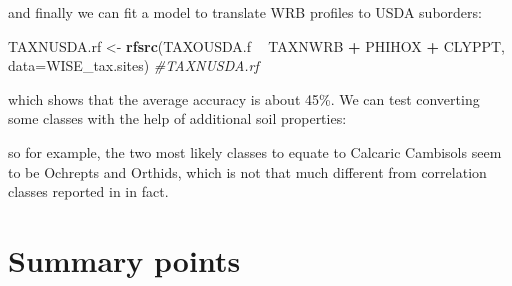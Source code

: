\documentclass[graybox,natbib,nospthms,UStrade]{svmono}
\newenvironment{Shaded}{\begin{snugshade}}{\end{snugshade}}
\newcommand{\CommentTok}[1]{\textcolor[rgb]{0.37,0.37,0.37}{\textit{#1}}}
\newcommand{\DataTypeTok}[1]{\textcolor[rgb]{0.27,0.27,0.27}{#1}}
\newcommand{\DecValTok}[1]{\textcolor[rgb]{0.06,0.06,0.06}{#1}}
\newcommand{\FloatTok}[1]{\textcolor[rgb]{0.06,0.06,0.06}{#1}}
\newcommand{\KeywordTok}[1]{\textcolor[rgb]{0.27,0.27,0.27}{\textbf{#1}}}
\newcommand{\NormalTok}[1]{#1}
\newcommand{\OperatorTok}[1]{\textcolor[rgb]{0.43,0.43,0.43}{\textbf{#1}}}
\newcommand{\StringTok}[1]{\textcolor[rgb]{0.5,0.5,0.5}{#1}}
\begin{document}
and finally we can fit a model to translate WRB profiles to USDA suborders:

\begin{Shaded}
\begin{Highlighting}[]
\NormalTok{TAXNUSDA.rf <-}\StringTok{ }\KeywordTok{rfsrc}\NormalTok{(TAXOUSDA.f }\OperatorTok{~}\StringTok{ }\NormalTok{TAXNWRB }\OperatorTok{+}\StringTok{ }\NormalTok{PHIHOX }\OperatorTok{+}\StringTok{ }\NormalTok{CLYPPT, }\DataTypeTok{data=}\NormalTok{WISE_tax.sites)}
\CommentTok{#TAXNUSDA.rf}
\end{Highlighting}
\end{Shaded}

which shows that the average accuracy is about 45\%. We can test converting some classes with the help of additional soil properties:

\begin{Shaded}
\end{Shaded}

so for example, the two most likely classes to equate to Calcaric Cambisols seem to be Ochrepts and Orthids, which is not that much different from correlation classes reported in \citet{Krasilnikov2009handbook} in fact.

\hypertarget{summary-points}{%
\section{Summary points}\label{summary-points}}
\end{document}
